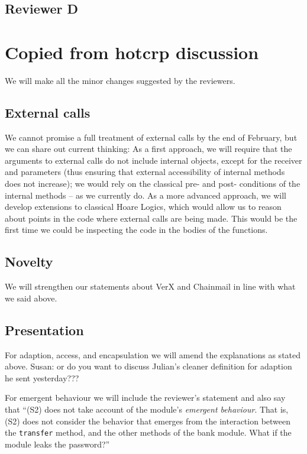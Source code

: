 \documentclass[11pt]{amsart}
\begin{document}
\subsection{Reviewer D}



\newpage



\section{Copied from hotcrp discussion}


 
 
  We will make all the minor changes suggested by the reviewers.
 \subsection*{External calls}
 We cannot promise a full treatment of external calls by the end of February, but we can share out current thinking:  As a first approach, we will require that the arguments to external calls do not include internal objects, except for the receiver and parameters (thus ensuring that external accessibility of internal methods does not increase); we would rely on the classical pre- and post- conditions of the internal methods -- as we currently do. As a more advanced approach, we will develop extensions to classical Hoare Logics, which would allow us to reason about points in the code where external calls are being made. This would be the first time we could be inspecting the code in the bodies of the functions.
 \subsection*{Novelty}
 We will strengthen our statements about VerX and Chainmail in line with what we said above.
 
 \subsection*{Presentation}
 
 For adaption, access, and encapsulation we will amend the explanations as stated above. Susan: or do you want to discuss Julian's cleaner definition for adaption he sent yesterday???
 
 For emergent behaviour we will include the reviewer's statement and also say that ``(S2) does not take account of the module's \emph{emergent behaviour}. That is, (S2) does not consider the behavior that emerges from the interaction between the 
\texttt{transfer} method, and the other methods of the bank module. What if the module leaks the password?''
 
\end{document}
